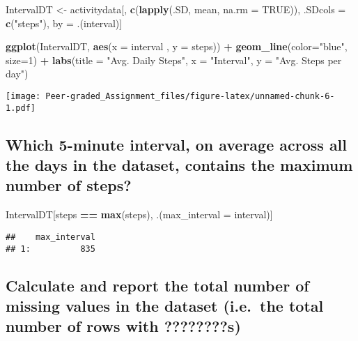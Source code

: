 \documentclass[
]{article}
\newenvironment{Shaded}{\begin{snugshade}}{\end{snugshade}}
\newcommand{\DataTypeTok}[1]{\textcolor[rgb]{0.13,0.29,0.53}{#1}}
\newcommand{\DecValTok}[1]{\textcolor[rgb]{0.00,0.00,0.81}{#1}}
\newcommand{\KeywordTok}[1]{\textcolor[rgb]{0.13,0.29,0.53}{\textbf{#1}}}
\newcommand{\NormalTok}[1]{#1}
\newcommand{\OperatorTok}[1]{\textcolor[rgb]{0.81,0.36,0.00}{\textbf{#1}}}
\newcommand{\OtherTok}[1]{\textcolor[rgb]{0.56,0.35,0.01}{#1}}
\newcommand{\StringTok}[1]{\textcolor[rgb]{0.31,0.60,0.02}{#1}}
\begin{document}
\begin{Shaded}
\begin{Highlighting}[]
\NormalTok{IntervalDT <-}\StringTok{ }\NormalTok{activitydata[, }\KeywordTok{c}\NormalTok{(}\KeywordTok{lapply}\NormalTok{(.SD, mean, }\DataTypeTok{na.rm =} \OtherTok{TRUE}\NormalTok{)), .SDcols =}\StringTok{ }\KeywordTok{c}\NormalTok{(}\StringTok{"steps"}\NormalTok{), by =}\StringTok{ }\NormalTok{.(interval)] }

\KeywordTok{ggplot}\NormalTok{(IntervalDT, }\KeywordTok{aes}\NormalTok{(}\DataTypeTok{x =}\NormalTok{ interval , }\DataTypeTok{y =}\NormalTok{ steps)) }\OperatorTok{+}\StringTok{ }\KeywordTok{geom_line}\NormalTok{(}\DataTypeTok{color=}\StringTok{"blue"}\NormalTok{, }\DataTypeTok{size=}\DecValTok{1}\NormalTok{) }\OperatorTok{+}\StringTok{ }\KeywordTok{labs}\NormalTok{(}\DataTypeTok{title =} \StringTok{"Avg. Daily Steps"}\NormalTok{, }\DataTypeTok{x =} \StringTok{"Interval"}\NormalTok{, }\DataTypeTok{y =} \StringTok{"Avg. Steps per day"}\NormalTok{)}
\end{Highlighting}
\end{Shaded}

\texttt{[image: Peer-graded\_Assignment\_files/figure-latex/unnamed-chunk-6-1.pdf]}

\hypertarget{which-5-minute-interval-on-average-across-all-the-days-in-the-dataset-contains-the-maximum-number-of-steps}{%
\subsection{Which 5-minute interval, on average across all the days in
the dataset, contains the maximum number of
steps?}\label{which-5-minute-interval-on-average-across-all-the-days-in-the-dataset-contains-the-maximum-number-of-steps}}

\begin{Shaded}
\begin{Highlighting}[]
\NormalTok{IntervalDT[steps }\OperatorTok{==}\StringTok{ }\KeywordTok{max}\NormalTok{(steps), .(}\DataTypeTok{max_interval =}\NormalTok{ interval)]}
\end{Highlighting}
\end{Shaded}

\begin{verbatim}
##    max_interval
## 1:          835
\end{verbatim}

\hypertarget{calculate-and-report-the-total-number-of-missing-values-in-the-dataset-i.e.-the-total-number-of-rows-with-s}{%
\subsection{Calculate and report the total number of missing values in
the dataset (i.e.~the total number of rows with
????????s)}\label{calculate-and-report-the-total-number-of-missing-values-in-the-dataset-i.e.-the-total-number-of-rows-with-s}}
\end{document}
